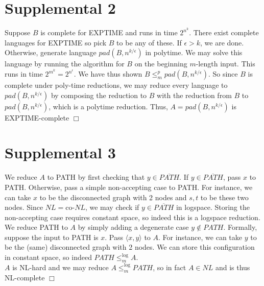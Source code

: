 \documentclass{article}
\begin{document}
\section*{Supplemental 2}
Suppose $B$ is complete for EXPTIME and runs in time $2^{n^k}$. There exist complete languages for EXPTIME so pick $B$ to be any of these. If $\epsilon > k$, we are done. Otherwise, generate language $pad(B,n^{k/\epsilon})$ in polytime. We may solve this language by running the algorithm for $B$ on the beginning $m$-length input. This runs in time $2^{m^k} = 2^{n^\epsilon}$. We have thus shown $B \leqslant_m^p pad(B,n^{k/\epsilon})$. So since $B$ is complete under poly-time reductions, we may reduce every language to $pad(B,n^{k/\epsilon})$ by composing the reduction to $B$ with the reduction from $B$ to $pad(B,n^{k/\epsilon})$, which is a polytime reduction. Thus, $A = pad(B,n^{k/\epsilon})$ is EXPTIME-complete $\Box$

\section*{Supplemental 3}
We reduce $A$ to PATH by first checking that $y \in \overline{PATH}$. If $y \in \overline{PATH}$, pass $x$ to PATH. Otherwise, pass a simple non-accepting case to PATH. For instance, we can take $x$ to be the disconnected graph with 2 nodes and $s,t$ to be these two nodes. Since $NL = \text{co-}NL$, we may check if $y \in \overline{PATH}$ in logspace. Storing the non-accepting case requires constant space, so indeed this is a logspace reduction.\\
We reduce PATH to $A$ by simply adding a degenerate case $y \notin PATH$. Formally, suppose the input to PATH is $x$. Pass $\langle x,y \rangle$ to $A$. For instance, we can take $y$ to be the (same) disconnected graph with 2 nodes. We can store this configuration in constant space, so indeed $PATH \leqslant_m^{\log} A$.\\
$A$ is NL-hard and we may reduce $A \leqslant_m^{\log} PATH$, so in fact $A \in NL$ and is thus NL-complete $\Box$
\end{document}

